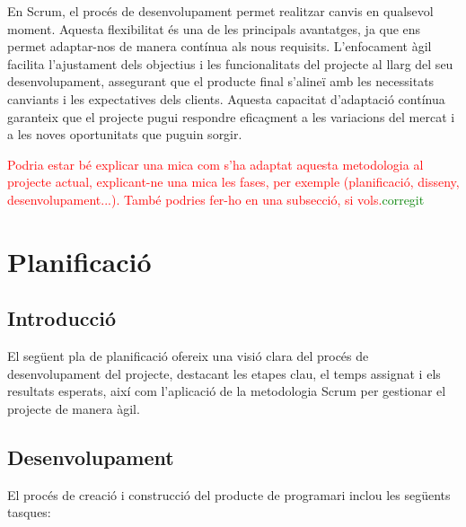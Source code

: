 \documentclass[a4paper,12pt,twoside]{ThesisStyle}
\newcommand{\pau}[1]{\textcolor{red}{#1}}
\newcommand{\sudan}[1]{\textcolor{green}{#1}}
\begin{document}
En Scrum, el procés de desenvolupament permet realitzar canvis en qualsevol moment. Aquesta flexibilitat és una de les principals avantatges, ja que ens permet adaptar-nos de manera contínua als nous requisits. L'enfocament àgil facilita l'ajustament dels objectius i les funcionalitats del projecte al llarg del seu desenvolupament, assegurant que el producte final s'alineï amb les necessitats canviants i les expectatives dels clients. Aquesta capacitat d'adaptació contínua garanteix que el projecte pugui respondre eficaçment a les variacions del mercat i a les noves oportunitats que puguin sorgir.



\pau{Podria estar bé explicar una mica com s'ha adaptat aquesta metodologia al projecte actual, explicant-ne una mica les fases, per exemple (planificació, disseny, desenvolupament...). També podries fer-ho en una subsecció, si vols.}\sudan{corregit}



\chapter{Planificació}
\label{chp:planificació}

\section{Introducció}
\label{sec:Introducció}

El següent pla de planificació ofereix una visió clara del procés de desenvolupament del projecte, destacant les etapes clau, el temps assignat i els resultats esperats, així com l'aplicació de la metodologia Scrum per gestionar el projecte de manera àgil.



\section{Desenvolupament}

El procés de creació i construcció del producte de programari inclou les següents tasques:
\end{document}
